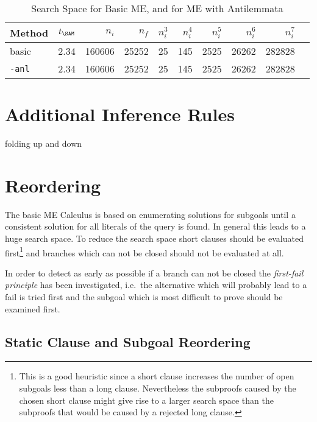 \begin{table}[htb]
\begin{center}
\begin{tabular}{|l|r|r||r|r||r|r|r|r|r|}
\hline
Method & $t_{\SAM}$ & $n_i$ & $n_f$ & 
	$n_i^3$ & $n_i^4$ & $n_i^5$ & $n_i^6$ & $n_i^7$ \\
\hline\hline
basic & 2.34 & 160606 & 25252 &
	25 & 145 & 2525 & 26262 & 282828 \\
\hline
{\tt -anl} & 2.34 & 160606 & 25252 &
	25 & 145 & 2525 & 26262 & 282828 \\
\hline\hline
\end{tabular}
\end{center}
\caption{Search Space for Basic ME, and for ME with Antilemmata}
\label{tab:tut2:results.anl}
\end{table}



\section{Additional Inference Rules}

folding up and down

\section{Reordering}

The basic ME Calculus is based on enumerating solutions for subgoals
until a consistent solution for all literals of the query is found. In
general this leads to a huge search space. To reduce the search space
short clauses should be evaluated first\footnote{This is a good
	heuristic since a short clause increases the number of open
	subgoals less than a long clause. Nevertheless the subproofs
	caused by the chosen short clause might give rise to a larger
	search space than the subproofs that would be caused by a
	rejected long clause.} 
and branches which can not be closed should not be evaluated at all.
 
In order to detect as early as possible if a branch can not be closed
the {\em first-fail principle\/} has been investigated, i.e.\ the
alternative which will probably lead to a fail is tried first and the
subgoal which is most difficult to prove should be examined first.


\subsection{Static Clause and Subgoal Reordering}

